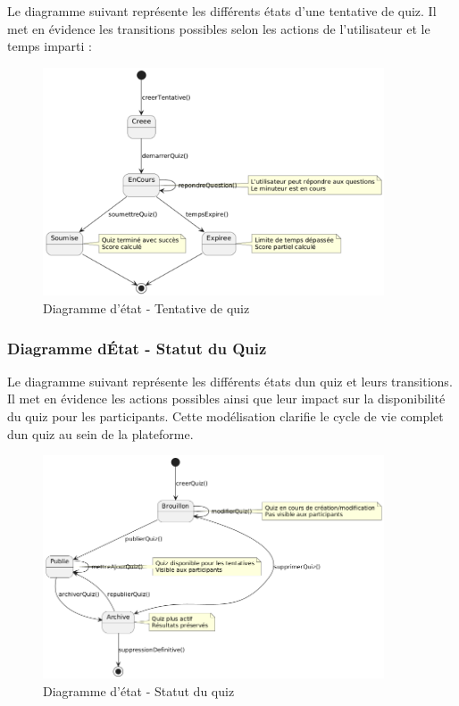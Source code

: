 \documentclass[12pt,a4paper,twoside,openright]{report}
\begin{document}
Le diagramme suivant représente les différents états d'une tentative de
quiz. Il met en évidence les transitions possibles selon les actions de
l'utilisateur et le temps imparti :

\begin{figure}[H]
\centering
\includegraphics[width=0.9\textwidth]{latex_media/media/image21.png}
\caption{Diagramme d'état - Tentative de quiz}
\label{fig:diagramme-etat-tentative}
\end{figure}

\hypertarget{diagramme-duxe9tat---statut-du-quiz}{%
\subsubsection{Diagramme d\textquotesingle État - Statut du
Quiz}\label{diagramme-duxe9tat---statut-du-quiz}}

Le diagramme suivant représente les différents états
d\textquotesingle un quiz et leurs transitions. Il met en évidence les
actions possibles ainsi que leur impact sur la disponibilité du quiz
pour les participants. Cette modélisation clarifie le cycle de vie
complet d\textquotesingle un quiz au sein de la plateforme.

\begin{figure}[H]
\centering
\includegraphics[width=0.9\textwidth]{latex_media/media/image22.png}
\caption{Diagramme d'état - Statut du quiz}
\label{fig:diagramme-etat-quiz}
\end{figure}
\end{document}
